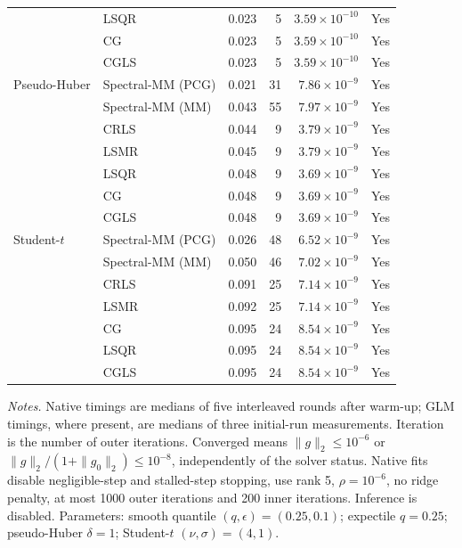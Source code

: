 \begin{longtable}{llrrrc}
 & LSQR & 0.023 & 5 & $3.59\times10^{-10}$ & Yes \\
 & CG & 0.023 & 5 & $3.59\times10^{-10}$ & Yes \\
 & CGLS & 0.023 & 5 & $3.59\times10^{-10}$ & Yes \\
\midrule
Pseudo-Huber & Spectral-MM (PCG) & 0.021 & 31 & $7.86\times10^{-9}$ & Yes \\
 & Spectral-MM (MM) & 0.043 & 55 & $7.97\times10^{-9}$ & Yes \\
 & CRLS & 0.044 & 9 & $3.79\times10^{-9}$ & Yes \\
 & LSMR & 0.045 & 9 & $3.79\times10^{-9}$ & Yes \\
 & LSQR & 0.048 & 9 & $3.69\times10^{-9}$ & Yes \\
 & CG & 0.048 & 9 & $3.69\times10^{-9}$ & Yes \\
 & CGLS & 0.048 & 9 & $3.69\times10^{-9}$ & Yes \\
\midrule
Student-$t$ & Spectral-MM (PCG) & 0.026 & 48 & $6.52\times10^{-9}$ & Yes \\
 & Spectral-MM (MM) & 0.050 & 46 & $7.02\times10^{-9}$ & Yes \\
 & CRLS & 0.091 & 25 & $7.14\times10^{-9}$ & Yes \\
 & LSMR & 0.092 & 25 & $7.14\times10^{-9}$ & Yes \\
 & CG & 0.095 & 24 & $8.54\times10^{-9}$ & Yes \\
 & LSQR & 0.095 & 24 & $8.54\times10^{-9}$ & Yes \\
 & CGLS & 0.095 & 24 & $8.54\times10^{-9}$ & Yes \\
\end{longtable}
\noindent\textit{Notes.} Native timings are medians of five interleaved rounds after warm-up; GLM timings, where present, are medians of three initial-run measurements. Iteration is the number of outer iterations. Converged means $\|g\|_2\leq10^{-6}$ or $\|g\|_2/(1+\|g_0\|_2)\leq10^{-8}$, independently of the solver status. Native fits disable negligible-step and stalled-step stopping, use rank 5, $\rho=10^{-6}$, no ridge penalty, at most 1000 outer iterations and 200 inner iterations. Inference is disabled.
Parameters: smooth quantile $(q,\epsilon)=(0.25,0.1)$; expectile $q=0.25$; pseudo-Huber $\delta=1$; Student-$t$ $(\nu,\sigma)=(4,1)$.
\par
\endgroup


